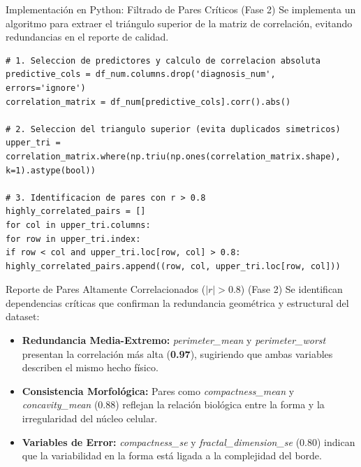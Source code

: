 \documentclass{beamer}
\begin{document}
	\begin{frame}[fragile]{Implementación en Python: Filtrado de Pares Críticos (Fase 2)}
		Se implementa un algoritmo para extraer el triángulo superior de la matriz de correlación, evitando redundancias en el reporte de calidad.
		
		\begin{lstlisting}[style=colab]
# 1. Seleccion de predictores y calculo de correlacion absoluta
predictive_cols = df_num.columns.drop('diagnosis_num', errors='ignore')
correlation_matrix = df_num[predictive_cols].corr().abs()

# 2. Seleccion del triangulo superior (evita duplicados simetricos)
upper_tri = correlation_matrix.where(np.triu(np.ones(correlation_matrix.shape), k=1).astype(bool))

# 3. Identificacion de pares con r > 0.8
highly_correlated_pairs = []
for col in upper_tri.columns:
for row in upper_tri.index:
if row < col and upper_tri.loc[row, col] > 0.8:
highly_correlated_pairs.append((row, col, upper_tri.loc[row, col]))
		\end{lstlisting}
	\end{frame}
	
	\begin{frame}{Reporte de Pares Altamente Correlacionados ($|r| > 0.8$) (Fase 2)}
		Se identifican dependencias críticas que confirman la redundancia geométrica y estructural del dataset:
		
		\begin{itemize}
			\item<2-> \textbf{Redundancia Media-Extremo:} \textit{perimeter\_mean} y \textit{perimeter\_worst} presentan la correlación más alta (\textbf{0.97}), sugiriendo que ambas variables describen el mismo hecho físico.
			\item<3-> \textbf{Consistencia Morfológica:} Pares como \textit{compactness\_mean} y \textit{concavity\_mean} (0.88) reflejan la relación biológica entre la forma y la irregularidad del núcleo celular.
			\item<4-> \textbf{Variables de Error:} \textit{compactness\_se} y \textit{fractal\_dimension\_se} (0.80) indican que la variabilidad en la forma está ligada a la complejidad del borde.
		\end{itemize}
	\end{frame}
	
\end{document}
